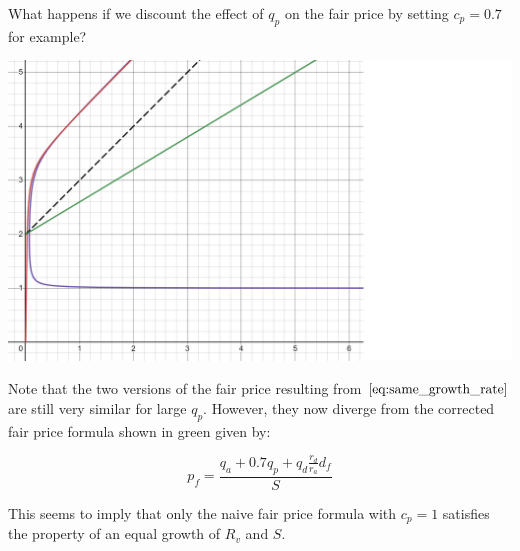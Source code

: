 \documentclass{article}
\begin{document}
\pagebreak

What happens if we discount the effect of $q_p$ on the fair price by setting $c_p=0.7$ for example?

\includegraphics[width=\linewidth]{./ChickenBonds_Whitepaper_growth_price_2.png}

Note that the two versions of the fair price resulting from $\ref{eq:same_growth_rate}$ are still very similar for large $q_p$. However, they now diverge from the corrected fair price formula shown in green given by:

\begin{equation}
  \label{eq:corrected-naive}
   p_f = \frac{q_a + 0.7q_p + q_d \frac{r_d}{r_a} d_f}{S}
\end{equation}

This seems to imply that only the naive fair price formula with $c_p=1$ satisfies the property of an equal growth of $R_v$ and $S$. 





\end{document}
